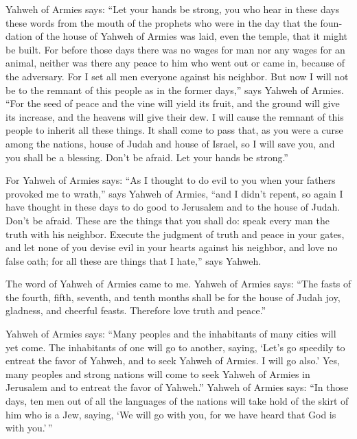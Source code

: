 \begin{paracol}{2}
\begin{otherlanguage}{english}
 Yahweh of Armies says: ``Let your hands be strong, you
who hear in these days these words from the mouth of the prophets who
were in the day that the foundation of the house of Yahweh of Armies was
laid, even the temple, that it might be built.  For
before those days there was no wages for man nor any wages for an
animal, neither was there any peace to him who went out or came in,
because of the adversary. For I set all men everyone against his
neighbor.  But now I will not be to the remnant of this
people as in the former days,'' says Yahweh of Armies. 
``For the seed of peace and the vine will yield its fruit, and the
ground will give its increase, and the heavens will give their dew. I
will cause the remnant of this people to inherit all these things.
 It shall come to pass that, as you were a curse among
the nations, house of Judah and house of Israel, so I will save you, and
you shall be a blessing. Don't be afraid. Let your hands be strong.''

 For Yahweh of Armies says: ``As I thought to do evil to
you when your fathers provoked me to wrath,'' says Yahweh of Armies,
``and I didn't repent,  so again I have thought in these
days to do good to Jerusalem and to the house of Judah. Don't be afraid.
 These are the things that you shall do: speak every man
the truth with his neighbor. Execute the judgment of truth and peace in
your gates,  and let none of you devise evil in your
hearts against his neighbor, and love no false oath; for all these are
things that I hate,'' says Yahweh.

 The word of Yahweh of Armies came to me. 
Yahweh of Armies says: ``The fasts of the fourth, fifth, seventh, and
tenth months shall be for the house of Judah joy, gladness, and cheerful
feasts. Therefore love truth and peace.''

 Yahweh of Armies says: ``Many peoples and the
inhabitants of many cities will yet come.  The
inhabitants of one will go to another, saying, `Let's go speedily to
entreat the favor of Yahweh, and to seek Yahweh of Armies. I will go
also.'  Yes, many peoples and strong nations will come to
seek Yahweh of Armies in Jerusalem and to entreat the favor of Yahweh.''
 Yahweh of Armies says: ``In those days, ten men out of
all the languages of the nations will take hold of the skirt of him who
is a Jew, saying, `We will go with you, for we have heard that God is
with you.'\,''


\end{otherlanguage}
\end{paracol}
